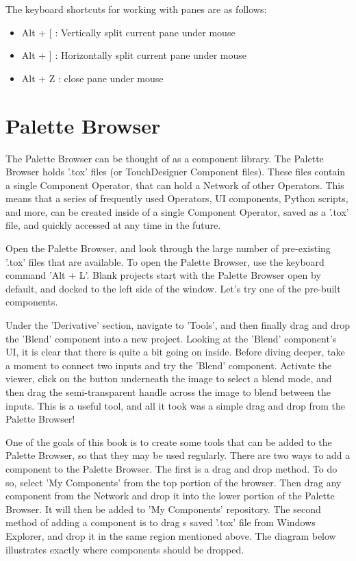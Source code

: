 \begin{fullwidth}
The keyboard shortcuts for working with panes are as follows:

\begin{itemize}
\item Alt + [ : Vertically split current pane under mouse
\item Alt + ] : Horizontally split current pane under mouse
\item Alt + Z : close pane under mouse
\end{itemize}

\end{fullwidth}
\section{Palette Browser}

\begin{fullwidth}

The Palette Browser can be thought of as a component library. The Palette Browser holds '.tox' files (or TouchDesigner Component files). These files contain a single Component Operator, that can hold a Network of other Operators. This means that a series of frequently used Operators, UI components, Python scripts, and more, can be created inside of a single Component Operator, saved as a '.tox' file, and quickly accessed at any time in the future.

Open the Palette Browser, and look through the large number of pre-existing '.tox' files that are available. To open the Palette Browser, use the keyboard command 'Alt + L'. Blank projects start with the Palette Browser open by default, and docked to the left side of the window. Let's try one of the pre-built components. 

Under the 'Derivative' section, navigate to 'Tools', and then finally drag and drop the 'Blend' component into a new project. Looking at the 'Blend' component's UI, it is clear that there is quite a bit going on inside. Before diving deeper, take a moment to connect two inputs and try the 'Blend' component. Activate the viewer, click on the button underneath the image to select a blend mode, and then drag the semi-transparent handle across the image to blend between the inputs. This is a useful tool, and all it took was a simple drag and drop from the Palette Browser!

One of the goals of this book is to create some tools that can be added to the Palette Browser, so that they may be used regularly. There are two ways to add a component to the Palette Browser. The first is a drag and drop method. To do so, select 'My Components' from the top portion of the browser. Then drag any component from the Network and drop it into the lower portion of the Palette Browser. It will then be added to 'My Components' repository. The second method of adding a component is to drag s saved '.tox' file from Windows Explorer, and drop it in the same region mentioned above. The diagram below illustrates exactly where components should be dropped.  


\end{fullwidth}
